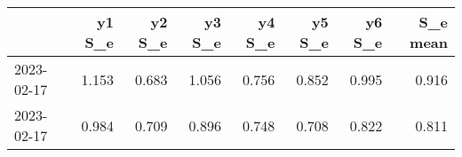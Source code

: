 \begin{tabular}{lrrrrrrr}
\toprule
{} &  y1 S\_e &  y2 S\_e &  y3 S\_e &  y4 S\_e &  y5 S\_e &  y6 S\_e &  S\_e mean \\
\midrule
2023-02-17 &   1.153 &   0.683 &   1.056 &   0.756 &   0.852 &   0.995 &     0.916 \\
2023-02-17 &   0.984 &   0.709 &   0.896 &   0.748 &   0.708 &   0.822 &     0.811 \\
\bottomrule
\end{tabular}
